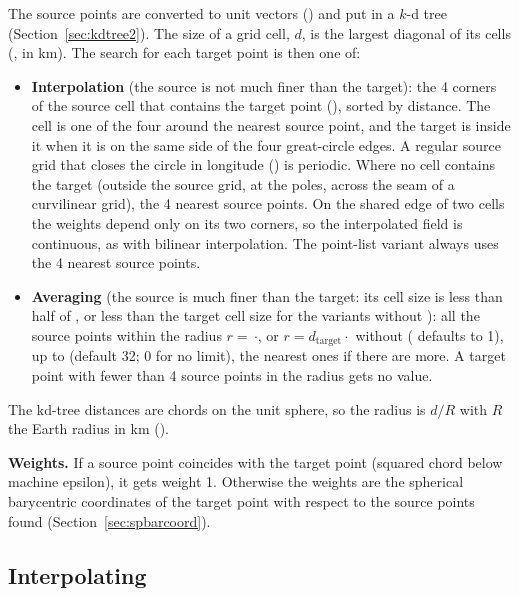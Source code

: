 The source points are converted to unit vectors () and put in a
$k$-d tree (Section~\ref{sec:kdtree2}). The size of a grid cell, $d$, is
the largest diagonal of its cells (, in km). The search for
each target point is then one of:

\begin{itemize}
  \item \textbf{Interpolation} (the source is not much finer than the
        target): the 4 corners of the source cell that contains the target
        point (), sorted by distance. The cell is one
        of the four around the nearest source point, and the target is
        inside it when it is on the same side of the four great-circle
        edges. A regular source grid that closes the circle in longitude
        () is periodic. Where no cell contains
        the target (outside the source grid, at the poles, across the
        seam of a curvilinear grid), the 4 nearest source points. On the
        shared edge of two cells the weights depend only on its two
        corners, so the interpolated field is continuous, as with bilinear
        interpolation. The point-list variant always uses the 4 nearest
        source points.
  \item \textbf{Averaging} (the source is much finer than the target: its
        cell size is less than half of , or less than the target
        cell size for the variants without ): all the source
        points within the radius $r = $\,$\cdot$, or
        $r = d_\text{target}\cdot$ without 
        ( defaults to 1), up to  (default 32; 0 for no
        limit), the nearest ones if there are more. A target point with
        fewer than 4 source points in the radius gets no value.
\end{itemize}

\noindent The kd-tree distances are chords on the unit sphere, so the radius
is $d/R$ with $R$ the Earth radius in km ().

\textbf{Weights.} If a source point coincides with the target point
(squared chord below machine epsilon), it gets weight 1. Otherwise the
weights are the spherical barycentric coordinates of the target point with
respect to the source points found (Section~\ref{sec:spbarcoord}).

\subsection{Interpolating}

